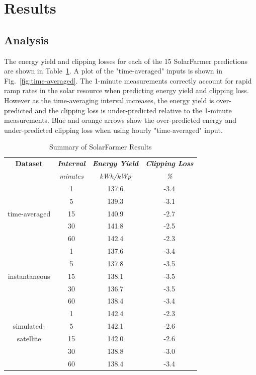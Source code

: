 \documentclass[conference]{IEEEtran}
\begin{document}
\section{Results}
\label{section:results}

\subsection{Analysis}
The energy yield and clipping losses for each of the 15 SolarFarmer predictions are shown in Table~\ref{table:results-summary}. A plot of the "time-averaged" inputs is shown in Fig.~\ref{fig:time-averaged}. The 1-minute measurements correctly account for rapid ramp rates in the solar resource when predicting energy yield and clipping loss. However as the time-averaging interval increases, the energy yield is over-predicted and the clipping loss is under-predicted relative to the 1-minute measurements. Blue and orange arrows show the over-predicted energy and under-predicted clipping loss when using hourly "time-averaged" input.

\begin{table}[htbp]
\caption{Summary of SolarFarmer Results}
\begin{center}
\begin{tabular}{|c|c|c|c|}
\hline
\textbf{Dataset} & \textbf{\textit{Interval}}& \textbf{\textit{Energy Yield}}& \textbf{\textit{Clipping Loss}} \\
                 & \textit{minutes}& \textit{kWh/kWp}& \textit{\%} \\
\hline
             &  1& 137.6& -3.4 \\
             &  5& 139.3& -3.1 \\
time-averaged& 15& 140.9& -2.7 \\
             & 30& 141.8& -2.5 \\
             & 60& 142.4& -2.3 \\
\hline
             &  1& 137.6& -3.4 \\
             &  5& 137.8& -3.5 \\
instantaneous& 15& 138.1& -3.5 \\
             & 30& 136.7& -3.5 \\
             & 60& 138.4& -3.4 \\
\hline
             &  1& 142.4& -2.3 \\
simulated-   &  5& 142.1& -2.6 \\
satellite    & 15& 142.0& -2.6 \\
             & 30& 138.8& -3.0 \\
             & 60& 138.4& -3.4 \\
\hline
\end{tabular}
\label{table:results-summary}
\end{center}
\end{table}
\end{document}
